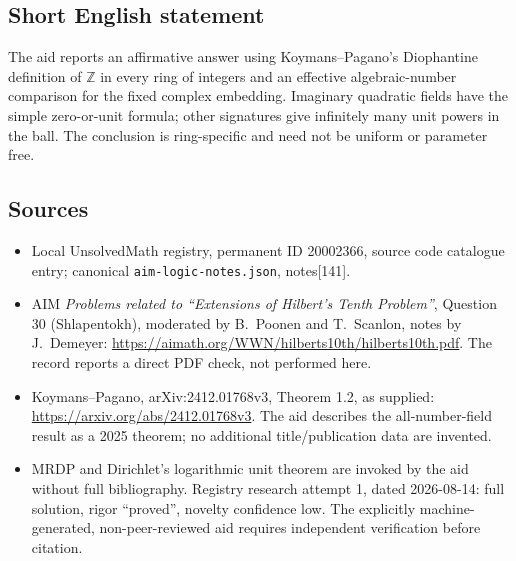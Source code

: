 \documentclass[11pt]{article}
\newcommand{\Z}{\mathbb{Z}}
\begin{document}
\subsection{Short English statement}
The aid reports an affirmative answer using Koymans--Pagano's Diophantine definition of $\Z$ in every ring of integers and an effective algebraic-number comparison for the fixed complex embedding. Imaginary quadratic fields have the simple zero-or-unit formula; other signatures give infinitely many unit powers in the ball. The conclusion is ring-specific and need not be uniform or parameter free.
\subsection{Sources}
\begin{itemize}
\item Local UnsolvedMath registry, permanent ID 20002366, source code catalogue entry; canonical \texttt{aim-logic-notes.json}, notes[141].
\item AIM \emph{Problems related to ``Extensions of Hilbert's Tenth Problem''}, Question 30 (Shlapentokh), moderated by B.~Poonen and T.~Scanlon, notes by J.~Demeyer: \url{https://aimath.org/WWN/hilberts10th/hilberts10th.pdf}. The record reports a direct PDF check, not performed here.
\item Koymans--Pagano, arXiv:2412.01768v3, Theorem 1.2, as supplied: \url{https://arxiv.org/abs/2412.01768v3}. The aid describes the all-number-field result as a 2025 theorem; no additional title/publication data are invented.
\item MRDP and Dirichlet's logarithmic unit theorem are invoked by the aid without full bibliography. Registry research attempt 1, dated 2026-08-14: full solution, rigor ``proved'', novelty confidence low. The explicitly machine-generated, non-peer-reviewed aid requires independent verification before citation.
\end{itemize}
\end{document}

